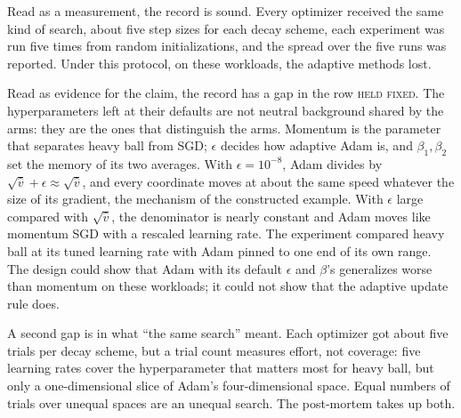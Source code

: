 \begin{refsection}
\begin{experiment}[Wilson et al.\ 2017]
\end{experiment}

Read as a measurement, the record is sound. Every optimizer received the same kind of search, about five step sizes for each decay scheme, each experiment was run five times from random initializations, and the spread over the five runs was reported. Under this protocol, on these workloads, the adaptive methods lost.

Read as evidence for the claim, the record has a gap in the row \textsc{held fixed}. The hyperparameters left at their defaults are not neutral background shared by the arms: they are the ones that distinguish the arms. Momentum is the parameter that separates heavy ball from SGD; $\epsilon$ decides how adaptive Adam is, and $\beta_1,\beta_2$ set the memory of its two averages. With $\epsilon=10^{-8}$, Adam divides by $\sqrt{\hat v}+\epsilon\approx\sqrt{\hat v}$, and every coordinate moves at about the same speed whatever the size of its gradient, the mechanism of the constructed example. With $\epsilon$ large compared with $\sqrt{\hat v}$, the denominator is nearly constant and Adam moves like momentum SGD with a rescaled learning rate. The experiment compared heavy ball at its tuned learning rate with Adam pinned to one end of its own range. The design could show that Adam with its default $\epsilon$ and $\beta$'s generalizes worse than momentum on these workloads; it could not show that the adaptive update rule does.

A second gap is in what \enquote{the same search} meant. Each optimizer got about five trials per decay scheme, but a trial count measures effort, not coverage: five learning rates cover the hyperparameter that matters most for heavy ball, but only a one-dimensional slice of Adam's four-dimensional space. Equal numbers of trials over unequal spaces are an unequal search. The post-mortem takes up both.


\end{refsection}

